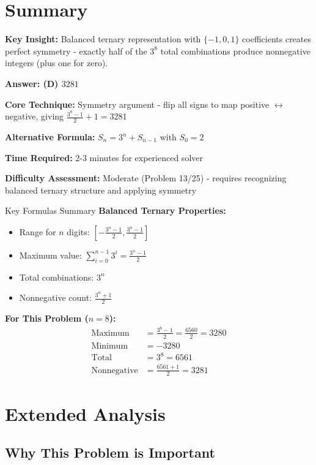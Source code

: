 \documentclass[12pt]{article}
\begin{document}
\section*{Summary}

\textbf{Key Insight:} Balanced ternary representation with $\{-1,0,1\}$ coefficients creates perfect symmetry - exactly half of the $3^8$ total combinations produce nonnegative integers (plus one for zero).

\textbf{Answer: (D) $3281$}

\textbf{Core Technique:} Symmetry argument - flip all signs to map positive $\leftrightarrow$ negative, giving $\frac{3^8-1}{2} + 1 = 3281$

\textbf{Alternative Formula:} $S_n = 3^n + S_{n-1}$ with $S_0 = 2$

\textbf{Time Required:} 2-3 minutes for experienced solver

\textbf{Difficulty Assessment:} Moderate (Problem 13/25) - requires recognizing balanced ternary structure and applying symmetry

\begin{highlightbox}{Key Formulas Summary}
\textbf{Balanced Ternary Properties:}
\begin{itemize}
    \item Range for $n$ digits: $\left[-\frac{3^n-1}{2}, \frac{3^n-1}{2}\right]$
    \item Maximum value: $\sum_{i=0}^{n-1} 3^i = \frac{3^n-1}{2}$
    \item Total combinations: $3^n$
    \item Nonnegative count: $\frac{3^n+1}{2}$
\end{itemize}

\textbf{For This Problem ($n=8$):}
\begin{align*}
\text{Maximum} &= \frac{3^8-1}{2} = \frac{6560}{2} = 3280\\
\text{Minimum} &= -3280\\
\text{Total} &= 3^8 = 6561\\
\text{Nonnegative} &= \frac{6561+1}{2} = 3281
\end{align*}
\end{highlightbox}

\section*{Extended Analysis}

\subsection*{Why This Problem is Important}
\end{document}
